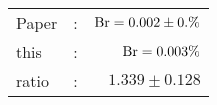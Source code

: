       \begin{tabular}{lcr}
          Paper &:& $\mathrm{Br}  = 0.002\pm 0.\%$ \\
          this      &:& $\mathrm{Br}  = 0.003\%$ \\
		  ratio   &:& $1.339\pm 0.128$ \\
      \end{tabular}

